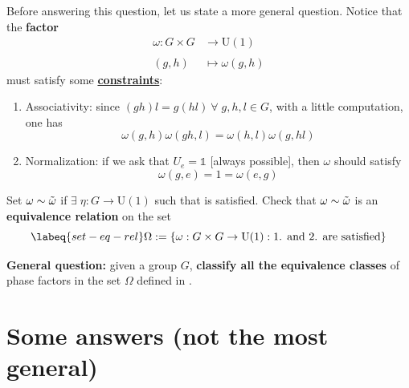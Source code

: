 \documentclass[../main.tex]{subfiles}
\begin{document}
Before answering this question, let us state a more general question. Notice that the \textbf{factor}
\begin{align*}
    \omega:G\times G&\xrightarrow[]{}\text{U}(1)\\
    (g,h)&\mapsto\omega(g,h)
\end{align*}
must satisfy some \underline{\textbf{constraints}}:
\begin{enumerate}
    \item Associativity: since $(gh)l=g(hl) \ \forall\;g,h,l\in G$, with a little computation, one has
    \[
    \omega(g,h)\omega(gh,l)=\omega(h,l)\omega(g,hl)
    \]
    \item Normalization: if we ask that $U_e=\mathbb{1}$ [always possible], then $\omega$ should satisfy
    \[
    \omega(g,e)=1=\omega(e,g)
    \]
\end{enumerate}
\begin{exercise}
Set $\omega\sim\Tilde{\omega}$ if $\exists\;\eta:G\to\textrm{U}(1)$ such that  is satisfied. Check that $\omega\sim\Tilde{\omega}$ is an \textbf{equivalence relation} on the set
\begin{equation}\labeq{set-eq-rel}
\Omega:=\Bqty{\omega:G\times G\to\textrm{U}(1): \textrm{1. and 2. are satisfied}}
\end{equation}
\end{exercise}
\textbf{General question:} given a group $G$, \textbf{classify all the equivalence classes} of phase factors in the set $\Omega$ defined in .
\section{Some answers (not the most general)}
\end{document}
